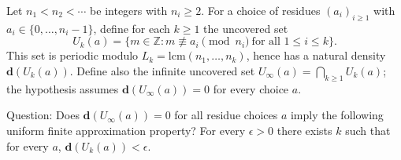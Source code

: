 Let $n_1<n_2<\cdots$ be integers with $n_i\ge 2$.
For a choice of residues $(a_i)_{i\ge 1}$ with $a_i\in\{0,\dots,n_i-1\}$, define for each $k\ge 1$ the uncovered set
\[U_k(a)=\{m\in\mathbb{Z}: m\not\equiv a_i\!\!\!\pmod{n_i}\ \text{for all }1\le i\le k\}.\]
This set is periodic modulo $L_k=\mathrm{lcm}(n_1,\dots,n_k)$, hence has a natural density $\mathbf{d}(U_k(a))$.
Define also the infinite uncovered set $U_\infty(a)=\bigcap_{k\ge 1}U_k(a)$; the hypothesis assumes $\mathbf{d}(U_\infty(a))=0$ for every choice $a$.

Question: Does $\mathbf{d}(U_\infty(a))=0$ for all residue choices $a$ imply the following uniform finite approximation property?
For every $\epsilon>0$ there exists $k$ such that for every $a$, $\mathbf{d}(U_k(a))<\epsilon$.
